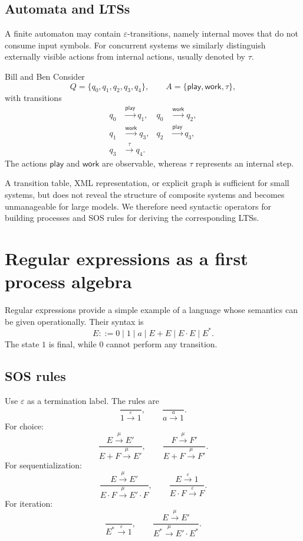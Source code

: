 \documentclass[a4paper]{article}
\newcommand{\eps}{\varepsilon}
\newcommand{\trans}[1]{\xrightarrow{#1}}
\begin{document}
\subsection{Automata and LTSs}

A finite automaton may contain \(\eps\)-transitions, namely internal moves that do not consume input symbols.
For concurrent systems we similarly distinguish externally visible actions from internal actions, usually denoted by \(\tau\).

\begin{snippetexample}{Bill and Ben}
    Consider
    \[
        Q=\{q_0,q_1,q_2,q_3,q_4\},
        \qquad
        A=\{\mathsf{play},\mathsf{work},\tau\},
    \]
    with transitions
    \begin{align*}
        q_0&\trans{\mathsf{play}}q_1,
        &q_0&\trans{\mathsf{work}}q_2,\\
        q_1&\trans{\mathsf{work}}q_3,
        &q_2&\trans{\mathsf{play}}q_3,\\
        q_3&\trans{\tau}q_4.
    \end{align*}
    The actions \(\mathsf{play}\) and \(\mathsf{work}\) are observable, whereas \(\tau\) represents an internal step.
\end{snippetexample}

A transition table, XML representation, or explicit graph is sufficient for small systems, but does not reveal the structure of composite systems and becomes unmanageable for large models.
We therefore need syntactic operators for building processes and SOS rules for deriving the corresponding LTSs.

\section{Regular expressions as a first process algebra}

Regular expressions provide a simple example of a language whose semantics can be given operationally.
Their syntax is
\[
    E ::= 0\mid1\mid a\mid E+E\mid E\cdot E\mid E^*.
\]
The state \(1\) is final, while \(0\) cannot perform any transition.

\subsection{SOS rules}

Use \(\eps\) as a termination label.
The rules are
\[
    \frac{}{1\trans{\eps}1},
    \qquad
    \frac{}{a\trans{a}1}.
\]
For choice:
\[
    \frac{E\trans{\mu}E'}{E+F\trans{\mu}E'},
    \qquad
    \frac{F\trans{\mu}F'}{E+F\trans{\mu}F'}.
\]
For sequentialization:
\[
    \frac{E\trans{\mu}E'}{E\cdot F\trans{\mu}E'\cdot F},
    \qquad
    \frac{E\trans{\eps}1}{E\cdot F\trans{\eps}F}.
\]
For iteration:
\[
    \frac{}{E^*\trans{\eps}1},
    \qquad
    \frac{E\trans{\mu}E'}{E^*\trans{\mu}E'\cdot E^*}.
\]
\end{document}

